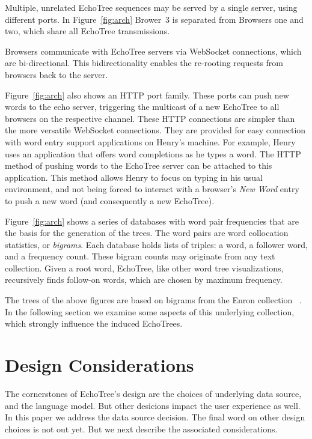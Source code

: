 \documentclass{sigchi}
\begin{document}
Multiple, unrelated EchoTree sequences may be served by a single
server, using different ports. In Figure~\ref{fig:arch}
Brower~3 is separated from Browsers one and two, which share all
EchoTree transmissions.

Browsers communicate with EchoTree servers via WebSocket connections,
which are bi-directional. This bidirectionality enables the re-rooting
requests from browsers back to the server.

Figure~\ref{fig:arch} also shows an HTTP port family. These ports can
push new words to the echo server, triggering the multicast of a new
EchoTree to all browsers on the respective channel. These HTTP
connections are simpler than the more versatile WebSocket
connections. They are provided for easy connection with word entry
support applications on Henry's machine. For example, Henry uses an
application that offers word completions as he types a word. The HTTP
method of pushing words to the EchoTree server can be attached to this
application. This method allows Henry to focus on typing in his usual
environment, and not being forced to interact with a browser's {\em
  New Word} entry to push a new word (and consequently a new
EchoTree).

Figure~\ref{fig:arch} shows a series of databases with word pair
frequencies that are the basis for the generation of the trees. The
word pairs are word collocation statistics, or {\em bigrams}.  Each
database holds lists of triples: a word, a follower word, and a
frequency count. These bigram counts may originate from any text
collection. Given a root word, EchoTree, like other word tree
visualizations, recursively finds follow-on words, which are chosen by
maximum frequency.

The trees of the above figures are based on bigrams from the Enron
collection ~\cite{enron}. In the following section we examine some
aspects of this underlying collection, which strongly influence the
induced EchoTrees.

\section{Design Considerations}

The cornerstones of EchoTree's design are the choices of underlying
data source, and the language model. But other desicions impact the
user experience as well. In this paper we address the data source
decision. The final word on other design choices is not out yet. But
we next describe the associated considerations.
\end{document}
